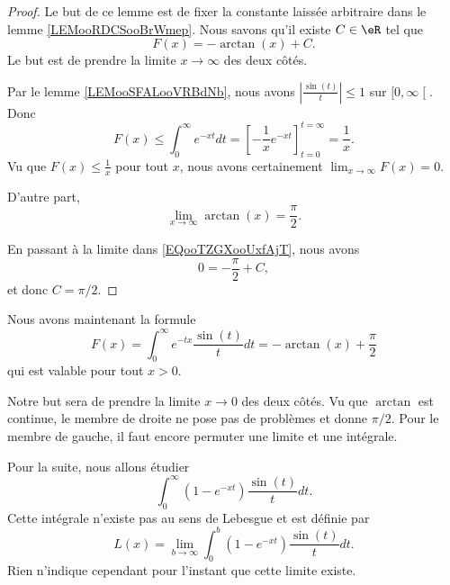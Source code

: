 \begin{proof}
    Le but de ce lemme est de fixer la constante laissée arbitraire dans le lemme \ref{LEMooRDCSooBrWmep}. Nous savons qu'il existe \( C\in \eR\) tel que
    \begin{equation}        \label{EQooTZGXooUxfAjT}
        F(x)=-\arctan(x)+C.
    \end{equation}
    Le but est de prendre la limite \( x\to\infty\) des deux côtés.

    Par le lemme \ref{LEMooSFALooVRBdNb}, nous avons \( | \frac{ \sin(t) }{ t } |\leq 1\) sur \( \mathopen[ 0 , \infty \mathclose[\). Donc
    \begin{equation}
        F(x)\leq \int_0^{\infty} e^{-xt}dt=\left[ -\frac{1}{ x } e^{-xt} \right]_{t=0}^{t=\infty}=\frac{1}{ x }.
    \end{equation}
    Vu que \( F(x)\leq \frac{1}{ x }\) pour tout \( x\), nous avons certainement \( \lim_{x\to \infty} F(x)=0\).

    D'autre part,
    \begin{equation}
        \lim_{x\to \infty} \arctan(x)=\frac{ \pi }{2}.
    \end{equation}
    
    En passant à la limite dans \eqref{EQooTZGXooUxfAjT}, nous avons
    \begin{equation}
        0=-\frac{ \pi }{2}+C,
    \end{equation}
    et donc \( C=\pi/2\).
\end{proof}

Nous avons maintenant la formule
\begin{equation}
    F(x)=\int_0^{\infty} e^{-tx}\frac{ \sin(t) }{ t }dt=-\arctan(x)+\frac{ \pi }{2}
\end{equation}
qui est valable pour tout \( x>0\).

Notre but sera de prendre la limite \( x\to 0\) des deux côtés. Vu que \( \arctan\) est continue, le membre de droite ne pose pas de problèmes et donne \( \pi/2\). Pour le membre de gauche, il faut encore permuter une limite et une intégrale.

Pour la suite, nous allons étudier\cite{BIBooCFXJooWrArNT}
\begin{equation}
    \int_0^{\infty}(1- e^{-xt})\frac{ \sin(t) }{ t }dt.
\end{equation}
Cette intégrale n'existe pas au sens de Lebesgue et est définie par
\begin{equation}
    L(x)=\lim_{b\to \infty} \int_0^b(1- e^{-xt})\frac{ \sin(t) }{ t }dt.
\end{equation}
Rien n'indique cependant pour l'instant que cette limite existe.

